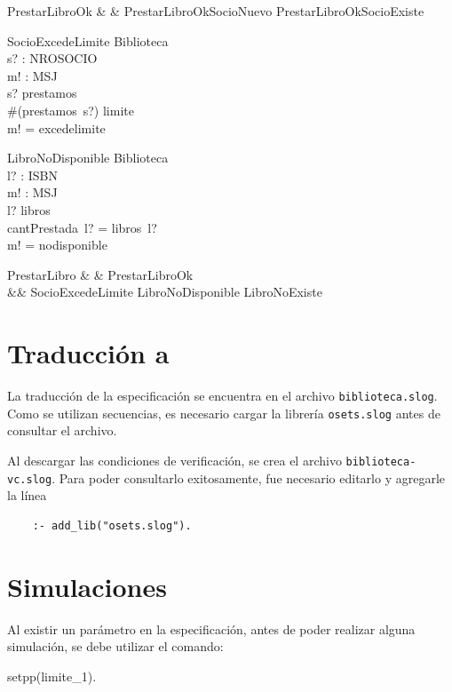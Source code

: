 \documentclass{article}
\begin{document}
\begin{syntax}
PrestarLibroOk &  & PrestarLibroOkSocioNuevo \lor PrestarLibroOkSocioExiste
\end{syntax}

\begin{schema}{SocioExcedeLimite}
\Xi Biblioteca \\
s? : NROSOCIO \\
m! : MSJ \\
\where
s? \in \dom prestamos \\
\#(prestamos~s?) \geq limite \\
m! = excedelimite \\
\end{schema}

\begin{schema}{LibroNoDisponible}
\Xi Biblioteca \\
l? : ISBN \\ 
m! : MSJ \\
\where
l? \in \dom libros \\
cantPrestada~l? = libros~l? \\
m! = nodisponible \\
\end{schema}

\begin{syntax}
PrestarLibro &  & PrestarLibroOk \lor \\
&& SocioExcedeLimite \lor LibroNoDisponible \lor LibroNoExiste \\
\end{syntax}

\section{Traducción a }
\sloppy La traducción de la especificación se encuentra en el archivo \texttt{biblioteca.slog}.
Como se utilizan secuencias, es necesario cargar la librería \texttt{osets.slog} antes de consultar el archivo.

Al descargar las condiciones de verificación, se crea el archivo \texttt{biblioteca-vc.slog}. Para poder consultarlo exitosamente, fue necesario editarlo y agregarle la línea
\begin{verbatim}
    :- add_lib("osets.slog").
\end{verbatim}

\section{Simulaciones}
Al existir un parámetro en la especificación, antes de poder realizar alguna simulación, se debe utilizar el comando:
\begin{verbatim*}
setpp(limite_1).
\end{verbatim*}
\end{document}
